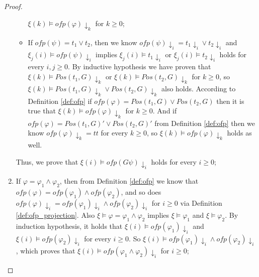 \documentclass[conference]{IEEEtran}
\newtheorem{proof}{IEEEproof}
\def\phi{\varphi}
\def\tt{\mathit{tt}}
\def\ofp#1{\mathit{ofp}(#1)}
\begin{document}
\begin{proof}
\begin{enumerate}
\begin{itemize}
      $\xi(k)\models\ofp{\phi}\!\downarrow_k$ for $k\geq 0$;
      \item If $\ofp{\psi}=t_1\vee t_2$, then we know $\ofp{\psi}\!\downarrow_i=t_1\!\downarrow_i\vee t_2\!\downarrow_i$ and $\xi_j(i)\models \ofp{\psi}\!\downarrow_i$ implies $\xi_j(i)\models t_1\!\downarrow_i$ or $\xi_j(i)\models t_2\!\downarrow_i$ holds for every $i,j\geq 0$. By inductive hypothesis we have proven that $\xi(k)\models Pos(t_1, G)\!\downarrow_k$ or $\xi(k)\models Pos(t_2, G)\!\downarrow_k$ for $k\geq 0$, so $\xi(k)\models Pos(t_1, G)\!\downarrow_k\vee Pos(t_2, G)\!\downarrow_k$ also holds. 
      According to Definition \ref{def:ofp} if $\ofp{\phi}=Pos(t_1,G)\vee Pos(t_2,G)$ then it is true that $\xi(k)\models\ofp{\phi}\!\downarrow_k$ for $k\geq 0$. And if $\ofp{\phi}=Pos(t_1,G)'\vee Pos(t_2, G)'$ from Definition \ref{def:ofp} then we know $\ofp{\phi}\!\downarrow_k=\tt$ for every $k\geq 0$, so $\xi(k)\models\ofp{\phi}\!\downarrow_k$ holds as well. 
    \end{itemize}
    Thus, we prove that $\xi(i)\models\ofp{G\psi}\!\downarrow_i$ holds for every $i\geq 0$;
    
    
    \item If $\phi=\phi_1\wedge \phi_2$, then from Definition \ref{def:ofp} we know that 
    $\ofp{\phi}=\ofp{\phi_1}\wedge \ofp{\phi_2}$, and so does 
    $\ofp{\phi}\!\downarrow_i=\ofp{\phi_1}\!\downarrow_i\wedge \ofp{\phi_2}\!\downarrow_i$ 
    for $i \geq 0$ via Definition \ref{def:ofp_projection}. 
    Also $\xi\models\phi=\phi_1\wedge\phi_2$ implies $\xi\models\phi_1$ and $\xi\models\phi_2$. 
    By induction hypothesis, it holds that $\xi(i)\models \ofp{\phi_1}\!\downarrow_i$ and 
    $\xi(i)\models \ofp{\phi_2}\!\downarrow_i$ for every $i\geq 0$. 
    So $\xi(i)\models \ofp{\phi_1}\!\downarrow_i\wedge \ofp{\phi_2}\!\downarrow_i$, 
    which proves that $\xi(i)\models \ofp{\phi_1\wedge\phi_2}\!\downarrow_i$ for $i\geq 0$;
    

\end{enumerate}
\end{proof}
\end{document}
